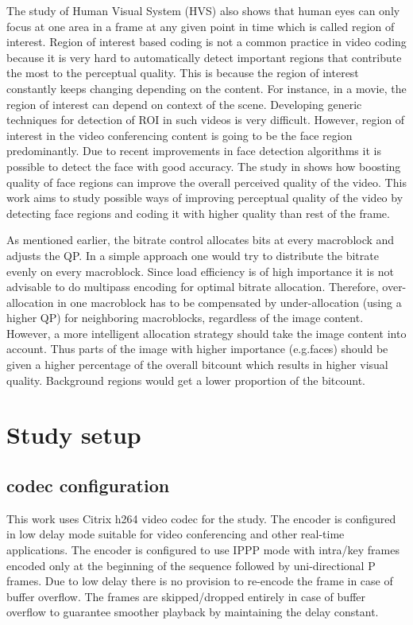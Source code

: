 \documentclass[11pt]{article} %
\begin{document}
The study of Human Visual System (HVS) also shows that human eyes can only focus at one area in a frame at any given point in time which is called region of interest. Region of interest based coding is not a common practice in video coding because it is very hard to automatically detect important regions that contribute the most to the perceptual quality. This is because the region of interest constantly keeps changing depending on the content. For instance, in a movie, the region of interest can depend on context of the scene. Developing generic techniques for detection of ROI in such videos is very difficult. However, region of interest in the video conferencing content is going to be the face region predominantly. Due to recent improvements in face detection algorithms it is possible to detect the face with good accuracy. The study in \cite{HighQualityROICodingForVideoConferencing} shows how boosting quality of face regions can improve the overall perceived quality of the video. This work aims to study possible ways of improving perceptual quality of the video by detecting face regions and coding it with higher quality than rest of the frame.

 As mentioned earlier, the bitrate control allocates bits at every macroblock and adjusts the QP. In a simple approach one would try to distribute the bitrate evenly on every macroblock. Since load efficiency is of high importance it is not advisable to do multipass encoding for optimal bitrate allocation. Therefore, over-allocation in one macroblock has to be compensated by under-allocation (using a higher QP) for neighboring macroblocks, regardless of the image content. However, a more intelligent allocation strategy should take the image content into account. Thus parts of the image with higher importance (e.g.faces) should be given a higher percentage of the overall bitcount which results in higher visual quality. Background regions would get a lower proportion of the bitcount.

\section{Study setup}
\subsection{codec configuration}      
This work uses Citrix h264 video codec for the study. The encoder is configured in low delay mode suitable for video conferencing and other real-time applications. The encoder is configured to use IPPP mode with intra/key frames encoded only at the beginning of the sequence followed by uni-directional P frames. Due to low delay there is no provision to re-encode the frame in case of buffer overflow. The frames are skipped/dropped entirely in case of buffer overflow to guarantee smoother playback by maintaining the delay constant. 
\end{document}
